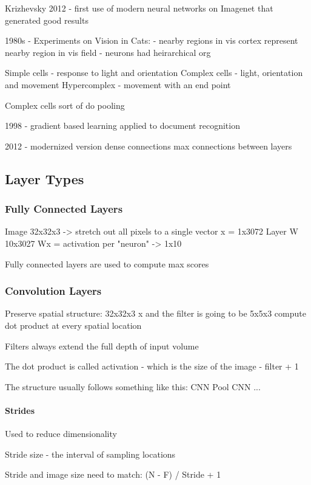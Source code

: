  Krizhevsky 2012 - first use of modern neural networks on Imagenet that generated good results


 1980s - Experiments on Vision in Cats: 
 - nearby regions in vis cortex represent nearby region in vis field
 - neurons had heirarchical org 

Simple cells - response to light and orientation 
Complex cells - light, orientation and movement 
Hypercomplex - movement with an end point

Complex cells sort of do pooling

1998 - gradient based learning applied to document recognition

2012 - modernized version
dense connections 
max connections between layers

\subsection{Layer Types}

\subsubsection{Fully Connected Layers}

Image 32x32x3 -> stretch out all pixels to a single vector x = 1x3072 
Layer W 10x3027
Wx = activation per "neuron" -> 1x10

Fully connected layers are used to compute max scores

\subsubsection{Convolution Layers}
Preserve spatial structure: 
32x32x3 x 
and the filter is going to be 5x5x3 
compute dot product at every spatial location

Filters always extend the full depth of input volume

The dot product is called activation - which is the size of the image - filter + 1

The structure usually follows something like this:
CNN
Pool
CNN
...

\paragraph{Strides}

Used to reduce dimensionality

Stride size - the interval of sampling locations

Stride and image size need to match: (N - F) / Stride + 1 

